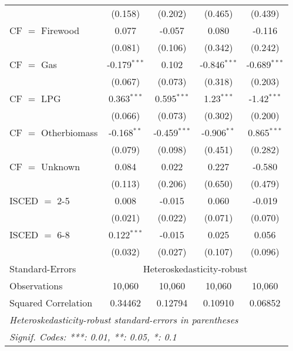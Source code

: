 \begin{table}[htbp!]
\begin{adjustbox}{width = 1\textwidth, max height = 0.95\textheight, center}
\begin{threeparttable}[b]
\begin{tabular}{lcccc}
                                 & (0.158)            & (0.202)            & (0.465)        & (0.439)\\   
            CF $=$ Firewood      & 0.077              & -0.057             & 0.080          & -0.116\\   
                                 & (0.081)            & (0.106)            & (0.342)        & (0.242)\\   
            CF $=$ Gas           & -0.179$^{***}$     & 0.102              & -0.846$^{***}$ & -0.689$^{***}$\\   
                                 & (0.067)            & (0.073)            & (0.318)        & (0.203)\\   
            CF $=$ LPG           & 0.363$^{***}$      & 0.595$^{***}$      & 1.23$^{***}$   & -1.42$^{***}$\\   
                                 & (0.066)            & (0.073)            & (0.302)        & (0.200)\\   
            CF $=$ Otherbiomass  & -0.168$^{**}$      & -0.459$^{***}$     & -0.906$^{**}$  & 0.865$^{***}$\\   
                                 & (0.079)            & (0.098)            & (0.451)        & (0.282)\\   
            CF $=$ Unknown       & 0.084              & 0.022              & 0.227          & -0.580\\   
                                 & (0.113)            & (0.206)            & (0.650)        & (0.479)\\   
            ISCED $=$ 2-5        & 0.008              & -0.015             & 0.060          & -0.019\\   
                                 & (0.021)            & (0.022)            & (0.071)        & (0.070)\\   
            ISCED $=$ 6-8        & 0.122$^{***}$      & -0.015             & 0.025          & 0.056\\   
                                 & (0.032)            & (0.027)            & (0.107)        & (0.096)\\   
            \midrule 
            Standard-Errors & \multicolumn{4}{c}{Heteroskedasticity-robust} \\ 
            Observations         & 10,060             & 10,060             & 10,060         & 10,060\\  
            Squared Correlation  & 0.34462            & 0.12794            & 0.10910        & 0.06852\\  
            \midrule \midrule
            \multicolumn{5}{l}{\emph{Heteroskedasticity-robust standard-errors in parentheses}}\\
            \multicolumn{5}{l}{\emph{Signif. Codes: ***: 0.01, **: 0.05, *: 0.1}}\\
         \end{tabular}
         

\end{threeparttable}
\end{adjustbox}
\end{table}
